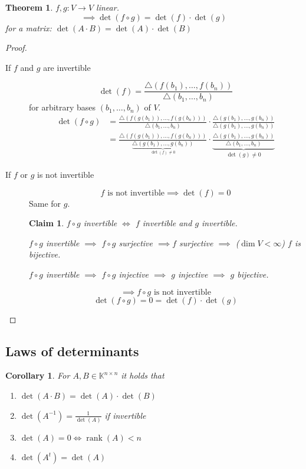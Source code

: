 \documentclass[a4paper]{article}
\newcounter{lecref}[section]
\numberwithin{lecref}{section}
\newtheorem{theorem}[lecref]{Theorem}
\newtheorem*{claim}{Claim}
\newtheorem{corollary}[lecref]{Corollary}
\DeclareMathOperator{\rank}{rank}
\begin{document}
\begin{theorem} %
  $f, g: V \to V$ linear.
  \[ \implies \det(f \circ g) = \det(f) \cdot \det(g) \]
  for a matrix: $\det(A \cdot B) = \det(A) \cdot \det(B)$
\end{theorem}

\begin{proof}
  \begin{description}
    \item[If $f$ and $g$ are invertible] 
      \[ \det(f) = \frac{\triangle (f(b_1), \dots, f(b_n))}{\triangle(b_1, \dots, b_n)} \]
      for arbitrary bases $(b_1, \dots, b_n)$ of $V$.
      \begin{align*}
        \det(f \circ g) &= \frac{\triangle(f(g(b_1)), \dots, f(g(b_n)))}{\triangle(b_1, \dots, b_n)} \cdot \frac{\triangle(g(b_1), \dots, g(b_n))}{\triangle(g(b_1), \dots, g(b_n))} \\
          &= \frac{\triangle(f(g(b_1)), \dots, f(g(b_n)))}{\underbrace{\triangle(g(b_1), \dots, g(b_n))}_{\det(f) \neq 0}} \cdot \underbrace{\frac{\triangle(g(b_1), \dots, g(b_n))}{\triangle(b_1, \dots, b_n)}}_{\det(g) \neq 0}
      \end{align*}
    \item[If $f$ or $g$ is not invertible]
      \[ f \text{ is not invertible} \implies \det(f) = 0 \]
      Same for $g$.

      \begin{claim}
        $f \circ g$ invertible $\iff$ $f$ invertible and $g$ invertible.

        $f \circ g$ invertible $\implies$ $f \circ g$ surjective $\implies f$ surjective $\implies$ ($\dim{V} < \infty$) $f$ is bijective.

        $f \circ g$ invertible $\implies$ $f \circ g$ injective $\implies$ $g$ injective $\implies$ $g$ bijective.
      \end{claim}

      \[ \implies f \circ g \text{ is not invertible} \]
      \[ \det(f \circ g) = 0 = \det(f) \cdot \det(g) \]
  \end{description}
\end{proof}

\subsection{Laws of determinants}

\begin{corollary} %
  \label{cor730}
  For $A, B \in \mathbb K^{n\times n}$ it holds that
  \begin{enumerate}
    \item $\det(A \cdot B) = \det(A) \cdot \det(B)$
    \item $\det(A^{-1}) = \frac{1}{\det(A)}$ if invertible
    \item $\det(A) = 0 \iff \rank(A) < n$
    \item $\det(A^t) = \det(A)$
  \end{enumerate}
\end{corollary}
\end{document}
